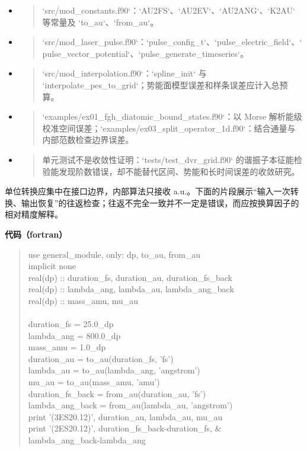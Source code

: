 \documentclass[UTF8,openany,11pt,fontset=fandol]{ctexbook}
\begin{document}
\begin{itemize}
\item
  \begin{quote}
  `src/mod\_constants.f90`：`AU2FS`、`AU2EV`、`AU2ANG`、`K2AU` 等常量及
  `to\_au`、`from\_au`。
  \end{quote}
\item
  \begin{quote}
  `src/mod\_laser\_pulse.f90`：`pulse\_config\_t`、`pulse\_electric\_field`、`pulse\_vector\_potential`、`pulse\_generate\_timeseries`。
  \end{quote}
\item
  \begin{quote}
  `src/mod\_interpolation.f90`：`spline\_init` 与
  `interpolate\_pes\_to\_grid`；势能面模型误差和样条误差应计入总预算。
  \end{quote}
\item
  \begin{quote}
  `examples/ex01\_fgh\_diatomic\_bound\_states.f90`：以 Morse
  解析能级校准空间误差；`examples/ex03\_split\_operator\_1d.f90`：结合通量与内部范数检查边界误差。
  \end{quote}
\item
  \begin{quote}
  单元测试不是收敛性证明：`tests/test\_dvr\_grid.f90`
  的谐振子本征能检验能发现阶数错误，却不能替代区间、势能和长时间误差的收敛研究。
  \end{quote}
\end{itemize}

单位转换应集中在接口边界，内部算法只接收
a.u.。下面的片段展示``输入一次转换、输出恢复''的往返检查；往返不完全一致并不一定是错误，而应按换算因子的相对精度解释。

\textbf{代码（fortran）}

\begin{quote}
use general\_module, only: dp, to\_au, from\_au\\
implicit none\\
real(dp) :: duration\_fs, duration\_au, duration\_fs\_back\\
real(dp) :: lambda\_ang, lambda\_au, lambda\_ang\_back\\
real(dp) :: mass\_amu, mu\_au\\
~\\
duration\_fs = 25.0\_dp\\
lambda\_ang = 800.0\_dp\\
mass\_amu = 1.0\_dp\\
duration\_au = to\_au(duration\_fs, 'fs')\\
lambda\_au = to\_au(lambda\_ang, 'angstrom')\\
mu\_au = to\_au(mass\_amu, 'amu')\\
duration\_fs\_back = from\_au(duration\_au, 'fs')\\
lambda\_ang\_back = from\_au(lambda\_au, 'angstrom')\\
print '(3ES20.12)', duration\_au, lambda\_au, mu\_au\\
print '(2ES20.12)', duration\_fs\_back-duration\_fs, \&\\
lambda\_ang\_back-lambda\_ang
\end{quote}
\end{document}
